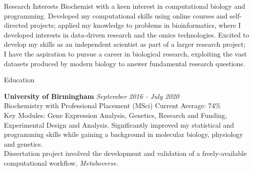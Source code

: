 \documentclass{resume}
\begin{document}
\begin{rSection}{Research Interests}
Biochemist with a keen interest in computational biology and programming. Developed my computational skills using online courses and self-directed projects; applied my knowledge to problems in bioinformatics, where I developed interests in data-driven research and the omics technologies. Excited to develop my skills as an independent scientist as part of a larger research project; I have the aspiration to pursue a career in biological research, exploiting the vast datasets produced by modern biology to answer fundamental research questions.
\end{rSection}
\begin{rSection}{Education}

{\bf University of Birmingham} \hfill {\em September 2016 - July 2020} 
\\ Biochemistry with Professional Placement (MSci) \hfill {Current Average: 74\%} \smallskip \\
Key Modules: Gene Expression Analysis, Genetics, Research and Funding, Experimental Design and Analysis. Significantly improved my statistical and programming skills while gaining a background in molecular biology, physiology and genetics. \smallskip \\ Dissertation project involved the development and validation of a freely-available computational workflow, \textit{Metaboverse}.  \\

\end{rSection}
\end{document}
